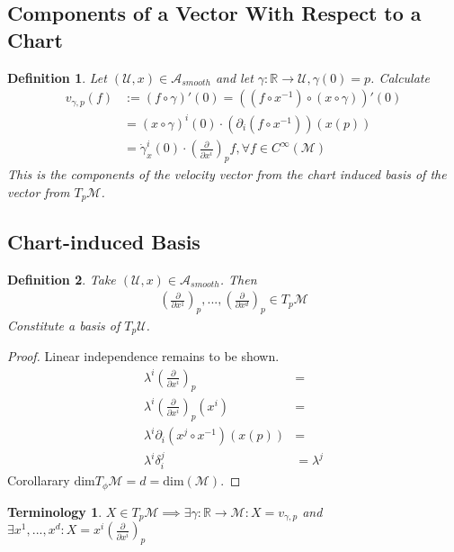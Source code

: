 \documentclass[10pt, oneside]{article}
\newcommand{\R}{\mathbb{R}}
\newcommand{\M}{\mathcal{M}}
\newtheorem{defn}{Definition}
\newtheorem{Terminology}{Terminology}
\begin{document}
  \subsection*{Components of a Vector With Respect to a Chart}
  \begin{defn}
     Let $(\mathcal{U},x) \in \mathcal{A}_{smooth}$ and let $\gamma: \R \to \mathcal{U}, \gamma(0) =p$. Calculate
     \begin{align*}
        v_{\gamma,p}(f)&:= (f \circ \gamma)'(0) = ((f \circ x^{-1})\circ(x\circ \gamma))'(0) \\
        &= (x \circ \gamma)^i (0) \cdot(\partial_i(f \circ x^{-1}))(x(p)) \\
        &= \dot{\gamma}_x^i (0) \cdot(\frac{\partial}{\partial x^i})_p f, \forall f \in C^{\infty}(\M)
     \end{align*}
     This is the components of the velocity vector from the chart induced basis of the vector from $T_p \M$.
  \end{defn}
  \subsection*{Chart-induced Basis}
  \begin{defn}
     Take $(\mathcal{U},x) \in \mathcal{A}_{smooth}$. Then
     \begin{align*}
        (\frac{\partial}{\partial x^1})_p, ..., (\frac{\partial}{\partial x^d})_p \in T_p \M
     \end{align*}
     Constitute a basis of $T_p \mathcal{U}$.
  \end{defn}
  \begin{proof}
     Linear independence remains to be shown.
     \begin{align*}
        \lambda^i (\frac{\partial}{\partial x^i})_p &=  \\
        \lambda^i (\frac{\partial}{\partial x^i})_p(x^i) &=\\
        \lambda^i \partial_i (x^j \circ x^{-1})(x(p)) &=  \\
        \lambda^i \delta_i^j &= \lambda^j
     \end{align*}
     Corollarary $\text{dim}T_\phi \M = d = \text{dim}(\M)$.
  \end{proof}
  \begin{Terminology}
     $X \in T_p \M \implies \exists \gamma: \R \to \M: X= v_{\gamma,p}$ and $\exists x^1, ..., x^d: X = x^i(\frac{\partial}{\partial x^i})_p$
  \end{Terminology}
\end{document}
